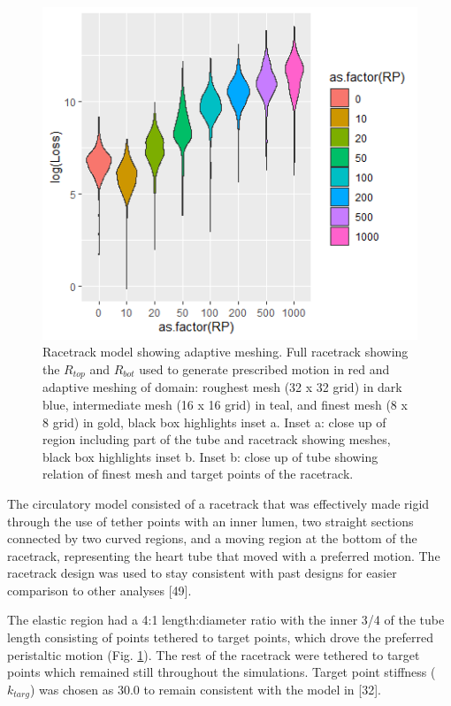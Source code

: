 \documentclass[
]{article}
\begin{document}
\begin{figure}
\includegraphics[width=1\linewidth]{../fig/Rplot} \caption{Racetrack model showing adaptive meshing. Full racetrack showing the $R_{top}$ and $R_{bot}$ used to generate prescribed motion in red and adaptive meshing of domain: roughest mesh (32 x 32 grid) in dark blue, intermediate mesh (16 x 16 grid) in teal, and finest mesh (8 x 8 grid) in gold, black box highlights inset a. Inset a: close up of region including part of the tube and racetrack showing meshes, black box highlights inset b. Inset b: close up of tube showing relation of finest mesh and target points of the racetrack. }\label{fig:grid-fig}
\end{figure}

The circulatory model consisted of a racetrack that was effectively made
rigid through the use of tether points with an inner lumen, two straight
sections connected by two curved regions, and a moving region at the
bottom of the racetrack, representing the heart tube that moved with a
preferred motion. The racetrack design was used to stay consistent with
past designs for easier comparison to other analyses {[}49{]}.

The elastic region had a 4:1 length:diameter ratio with the inner 3/4 of
the tube length consisting of points tethered to target points, which
drove the preferred peristaltic motion (Fig. \ref{fig:grid-fig}). The
rest of the racetrack were tethered to target points which remained
still throughout the simulations. Target point stiffness (\(k_{targ}\))
was chosen as 30.0 to remain consistent with the model in {[}32{]}.
\end{document}
